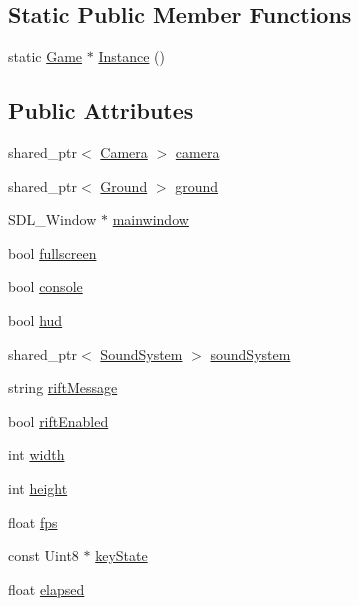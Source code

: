 \subsection*{Static Public Member Functions}
\begin{DoxyCompactItemize}
\item 
static \hyperlink{class_b_g_e_1_1_game}{Game} $\ast$ \hyperlink{class_b_g_e_1_1_game_aa5f23879cb825ddcfc1f5a3a64a9c70f}{Instance} ()
\end{DoxyCompactItemize}
\subsection*{Public Attributes}
\begin{DoxyCompactItemize}
\item 
shared\-\_\-ptr$<$ \hyperlink{class_b_g_e_1_1_camera}{Camera} $>$ \hyperlink{class_b_g_e_1_1_game_a529f329238da26b1bc8199f46edb6754}{camera}
\item 
shared\-\_\-ptr$<$ \hyperlink{class_b_g_e_1_1_ground}{Ground} $>$ \hyperlink{class_b_g_e_1_1_game_a116334f4ca84d0941072968b941b8c39}{ground}
\item 
S\-D\-L\-\_\-\-Window $\ast$ \hyperlink{class_b_g_e_1_1_game_a7d79db52e4ae135f72ac7d7e79b5fd89}{mainwindow}
\item 
bool \hyperlink{class_b_g_e_1_1_game_a6ccd351839e577cef28ffab9b64fb576}{fullscreen}
\item 
bool \hyperlink{class_b_g_e_1_1_game_ae6c23ffff29b83b65a253788e4e8a735}{console}
\item 
bool \hyperlink{class_b_g_e_1_1_game_aa7754d7d3f8b64ee1de1a540b32e83b1}{hud}
\item 
shared\-\_\-ptr$<$ \hyperlink{class_b_g_e_1_1_sound_system}{Sound\-System} $>$ \hyperlink{class_b_g_e_1_1_game_a4b56583497df19ed415237cc457cb622}{sound\-System}
\item 
string \hyperlink{class_b_g_e_1_1_game_a736d9a0a78227f23a2afb62a9a5bed90}{rift\-Message}
\item 
bool \hyperlink{class_b_g_e_1_1_game_a9c97f2f28873bab23b8b295961cf6ac6}{rift\-Enabled}
\item 
int \hyperlink{class_b_g_e_1_1_game_a273be7b9be0947918bb9e8423aa03bfc}{width}
\item 
int \hyperlink{class_b_g_e_1_1_game_ac012b897d5a88993c5c77cd633338a0e}{height}
\item 
float \hyperlink{class_b_g_e_1_1_game_a6827ac220d27fc4be181235f39f148c2}{fps}
\item 
const Uint8 $\ast$ \hyperlink{class_b_g_e_1_1_game_a9e0095e531e23c2b3368d76ef341ddd9}{key\-State}
\item 
float \hyperlink{class_b_g_e_1_1_game_aedae810ac31a45184e38a24b643d1825}{elapsed}
\end{DoxyCompactItemize}


